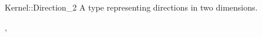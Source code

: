 \begin{ccRefConcept}{Kernel::Direction_2}
A type representing directions in two dimensions.

\ccRefines
{},

\ccSeeAlso
{}

\end{ccRefConcept}
